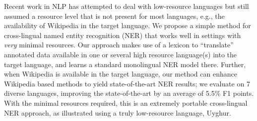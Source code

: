 Recent work in NLP has attempted to deal with low-resource languages but still assumed a resource level that is not present for most languages, e.g., the availability of Wikipedia in the target language. We propose a simple method for cross-lingual named entity recognition (NER) that works well in settings with {\em very} minimal resources. Our approach makes use of a lexicon to ``translate'' annotated data available in one or several high resource language(s) into the target language, and learns a standard monolingual NER model there. Further, when Wikipedia is available in the target language, our method can enhance Wikipedia based methods to yield state-of-the-art NER results; we evaluate on 7 diverse languages, improving the state-of-the-art by an average of 5.5\% F1 points. With the minimal resources required, this is an extremely portable cross-lingual NER approach, as illustrated using a truly low-resource language, Uyghur.
